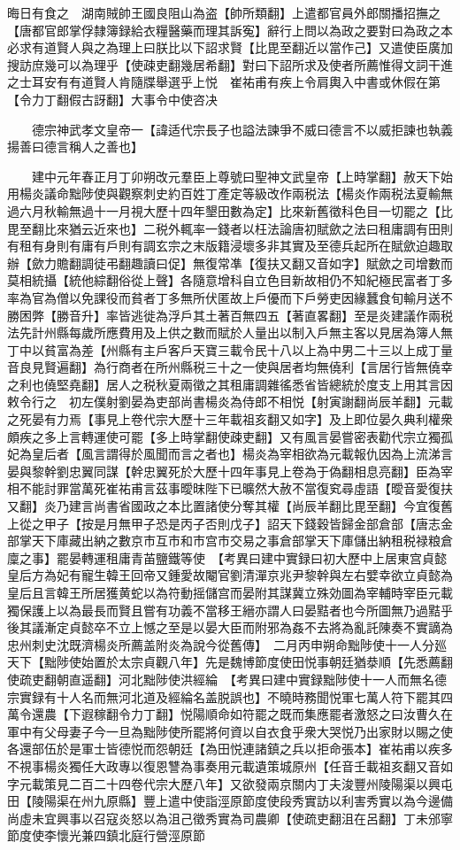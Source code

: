 晦日有食之　湖南賊帥王國良阻山為盗【帥所類翻】上遣都官員外郎關播招撫之【唐都官郎掌俘隸簿録給衣糧醫藥而理其訴寃】辭行上問以為政之要對曰為政之本必求有道賢人與之為理上曰朕比以下詔求賢【比毘至翻近以當作己】又遣使臣廣加搜訪庶幾可以為理乎【使疎吏翻幾居希翻】對曰下詔所求及使者所薦惟得文詞干進之士耳安有有道賢人肯隨牒舉選乎上悦　崔祐甫有疾上令肩輿入中書或休假在第【令力丁翻假古訝翻】大事令中使咨决

　　德宗神武孝文皇帝一【諱适代宗長子也謚法諫爭不威曰德言不以威拒諫也執義揚善曰德言稱人之善也】

　　建中元年春正月丁卯朔改元羣臣上尊號曰聖神文武皇帝【上時掌翻】赦天下始用楊炎議命黜陟使與觀察刺史約百姓丁產定等級改作兩税法【楊炎作兩税法夏輸無過六月秋輸無過十一月視大歷十四年墾田數為定】比來新舊徵科色目一切罷之【比毘至翻比來猶云近來也】二税外輒率一錢者以枉法論唐初賦歛之法曰租庸調有田則有租有身則有庸有戶則有調玄宗之末版籍浸壞多非其實及至德兵起所在賦歛迫趣取辦【歛力贍翻調徒弔翻趣讀曰促】無復常凖【復扶又翻又音如字】賦歛之司增數而莫相統攝【統他綜翻俗從上聲】各隨意增科自立色目新故相仍不知紀極民富者丁多率為官為僧以免課役而貧者丁多無所伏匿故上戶優而下戶勞吏因緣蠶食旬輸月送不勝困弊【勝音升】率皆逃徙為浮戶其土著百無四五【著直畧翻】至是炎建議作兩税法先計州縣每歲所應費用及上供之數而賦於人量出以制入戶無主客以見居為簿人無丁中以貧富為差【州縣有主戶客戶天寶三載令民十八以上為中男二十三以上成丁量音良見賢遍翻】為行商者在所州縣税三十之一使與居者均無僥利【言居行皆無僥幸之利也僥堅堯翻】居人之税秋夏兩徵之其租庸調雜徭悉省皆總統於度支上用其言因敕令行之　初左僕射劉晏為吏部尚書楊炎為侍郎不相悦【射寅謝翻尚辰羊翻】元載之死晏有力焉【事見上卷代宗大歷十三年載祖亥翻又如字】及上即位晏久典利權衆頗疾之多上言轉運使可罷【多上時掌翻使疎吏翻】又有風言晏嘗密表勸代宗立獨孤妃為皇后者【風言謂得於風聞而言之者也】楊炎為宰相欲為元載報仇因為上流涕言晏與黎幹劉忠翼同謀【幹忠翼死於大歷十四年事見上卷為于偽翻相息亮翻】臣為宰相不能討罪當萬死崔祐甫言茲事曖昩陛下已曠然大赦不當復䆒尋虛語【曖音愛復扶又翻】炎乃建言尚書省國政之本比置諸使分奪其權【尚辰羊翻比毘至翻】今宜復舊上從之甲子【按是月無甲子恐是丙子否則戊子】詔天下錢穀皆歸金部倉部【唐志金部掌天下庫藏出納之數京市互市和市宫市交易之事倉部掌天下庫儲出納租税禄粮倉廩之事】罷晏轉運租庸青苖鹽鐵等使　【考異曰建中實録曰初大歷中上居東宫貞懿皇后方為妃有寵生韓王回帝又鍾愛故閹官劉清潬京兆尹黎幹與左右嬖幸欲立貞懿為皇后且言韓王所居獲黄蛇以為符動摇儲宫而晏附其謀冀立殊効圖為宰輔時宰臣元載獨保護上以為最長而賢且嘗有功義不當移王縉亦謂人曰晏黠者也今所圖無乃過黠乎後其議漸定貞懿卒不立上憾之至是以晏大臣而附邪為姦不去將為亂託陳奏不實謫為忠州刺史沈既濟楊炎所薦盖附炎為說今從舊傳】　二月丙申朔命黜陟使十一人分廵天下【黜陟使始置於太宗貞觀八年】先是魏博節度使田悦事朝廷猶㳟順【先悉薦翻使疏吏翻朝直遥翻】河北黜陟使洪經綸　【考異曰建中實録黜陟使十一人而無名德宗實録有十人名而無河北道及經綸名盖脱誤也】不曉時務聞悦軍七萬人符下罷其四萬令還農【下遐稼翻令力丁翻】悦陽順命如符罷之既而集應罷者激怒之曰汝曹久在軍中有父母妻子今一旦為黜陟使所罷將何資以自衣食乎衆大哭悦乃出家財以賜之使各還部伍於是軍士皆德悦而怨朝廷【為田悦連諸鎮之兵以拒命張本】崔祐甫以疾多不視事楊炎獨任大政專以復恩讐為事奏用元載遺策城原州【任音壬載祖亥翻又音如字元載策見二百二十四卷代宗大歷八年】又欲發兩京關内丁夫浚豐州陵陽渠以興屯田【陵陽渠在州九原縣】豐上遣中使詣涇原節度使段秀實訪以利害秀實以為今邊備尚虛未宜興事以召寇炎怒以為沮己徵秀實為司農卿【使疏吏翻沮在呂翻】丁未邠寧節度使李懷光兼四鎮北庭行營涇原節